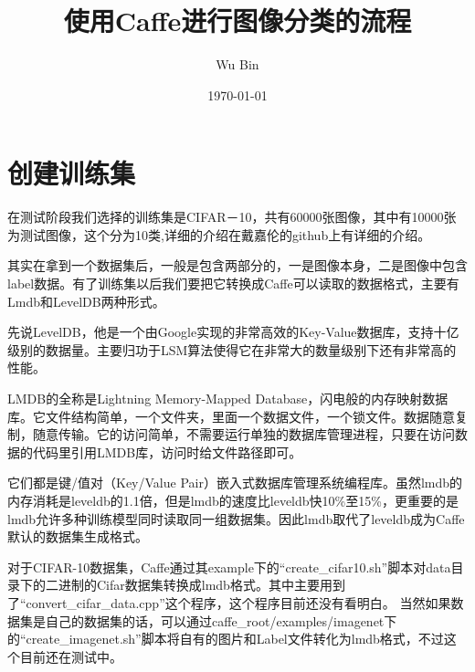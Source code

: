 

\title{\vspace{-2em} 使用Caffe进行图像分类的流程\\
\normalsize{}}
\author{Wu Bin}
\date{\vspace{-0.7em} \today \vspace{-0.7em}}
\maketitle\thispagestyle{fancy}
\maketitle
\section{创建训练集}
在测试阶段我们选择的训练集是CIFAR－10，共有60000张图像，其中有10000张为测试图像，这个分为10类,详细的介绍在戴嘉伦的github上有详细的介绍。

其实在拿到一个数据集后，一般是包含两部分的，一是图像本身，二是图像中包含label数据。有了训练集以后我们要把它转换成Caffe可以读取的数据格式，主要有Lmdb和LevelDB两种形式。

先说LevelDB，他是一个由Google实现的非常高效的Key-Value数据库，支持十亿级别的数据量。主要归功于LSM算法使得它在非常大的数量级别下还有非常高的性能。

LMDB的全称是Lightning Memory-Mapped Database，闪电般的内存映射数据库。它文件结构简单，一个文件夹，里面一个数据文件，一个锁文件。数据随意复制，随意传输。它的访问简单，不需要运行单独的数据库管理进程，只要在访问数据的代码里引用LMDB库，访问时给文件路径即可。

它们都是键/值对（Key/Value Pair）嵌入式数据库管理系统编程库。虽然lmdb的内存消耗是leveldb的1.1倍，但是lmdb的速度比leveldb快10\%至15\%，更重要的是lmdb允许多种训练模型同时读取同一组数据集。因此lmdb取代了leveldb成为Caffe默认的数据集生成格式。

对于CIFAR-10数据集，Caffe通过其example下的“create\_cifar10.sh”脚本对data目录下的二进制的Cifar数据集转换成lmdb格式。其中主要用到了“convert\_cifar\_data.cpp”这个程序，这个程序目前还没有看明白。
当然如果数据集是自己的数据集的话，可以通过caffe\_root/examples/imagenet下的“create\_imagenet.sh”脚本将自有的图片和Label文件转化为lmdb格式，不过这个目前还在测试中。



